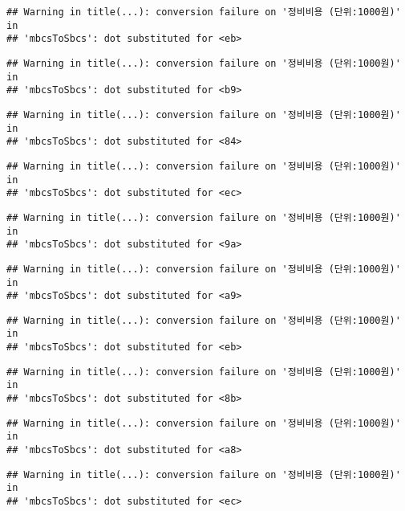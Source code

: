 \documentclass[
]{article}
\begin{document}
\begin{verbatim}
## Warning in title(...): conversion failure on '정비비용 (단위:1000원)' in
## 'mbcsToSbcs': dot substituted for <eb>
\end{verbatim}

\begin{verbatim}
## Warning in title(...): conversion failure on '정비비용 (단위:1000원)' in
## 'mbcsToSbcs': dot substituted for <b9>
\end{verbatim}

\begin{verbatim}
## Warning in title(...): conversion failure on '정비비용 (단위:1000원)' in
## 'mbcsToSbcs': dot substituted for <84>
\end{verbatim}

\begin{verbatim}
## Warning in title(...): conversion failure on '정비비용 (단위:1000원)' in
## 'mbcsToSbcs': dot substituted for <ec>
\end{verbatim}

\begin{verbatim}
## Warning in title(...): conversion failure on '정비비용 (단위:1000원)' in
## 'mbcsToSbcs': dot substituted for <9a>
\end{verbatim}

\begin{verbatim}
## Warning in title(...): conversion failure on '정비비용 (단위:1000원)' in
## 'mbcsToSbcs': dot substituted for <a9>
\end{verbatim}

\begin{verbatim}
## Warning in title(...): conversion failure on '정비비용 (단위:1000원)' in
## 'mbcsToSbcs': dot substituted for <eb>
\end{verbatim}

\begin{verbatim}
## Warning in title(...): conversion failure on '정비비용 (단위:1000원)' in
## 'mbcsToSbcs': dot substituted for <8b>
\end{verbatim}

\begin{verbatim}
## Warning in title(...): conversion failure on '정비비용 (단위:1000원)' in
## 'mbcsToSbcs': dot substituted for <a8>
\end{verbatim}

\begin{verbatim}
## Warning in title(...): conversion failure on '정비비용 (단위:1000원)' in
## 'mbcsToSbcs': dot substituted for <ec>
\end{verbatim}
\end{document}
